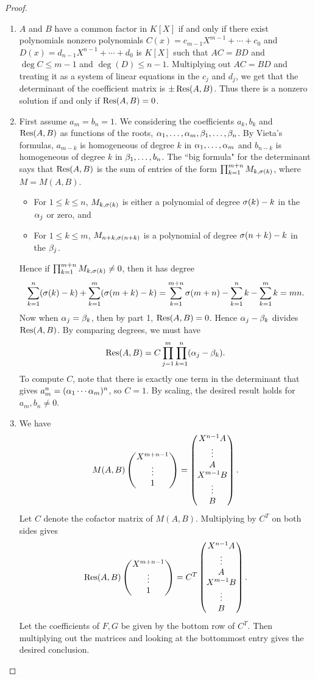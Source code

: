 \begin{proof}$\,$
\begin{enumerate}
\item $A$ and $B$ have a common factor in $K[X]$ if and only if there exist polynomials nonzero polynomials $C(x)=c_{m-1}X^{m-1}+\cdots +c_0$ and $D(x)=d_{n-1}X^{n-1}+\cdots +d_0$ is $K[X]$ such that $AC=BD$ and $\deg C\le m-1$ and $\deg(D)\le n-1$. Multiplying out $AC=BD$ and treating it as a system of linear equations in the $c_j$ and $d_j$, we get that the determinant of the coefficient matrix is $\pm \operatorname{Res}(A,B)$. Thus there is a nonzero solution if and only if $\operatorname{Res}(A,B)=0$.
\item 
First assume $a_m=b_n=1$. We considering the coefficients $a_k,b_k$ and $\operatorname{Res}(A,B)$ as functions of the roots, $\alpha_1,\ldots, \alpha_m,\beta_1,\ldots, \beta_n$. 
By Vieta's formulas, $a_{m-k}$ is homogeneous of degree $k$ in $\alpha_1,\ldots, \alpha_m$ and $b_{n-k}$ is homogeneous of degree $k$ in $\beta_1,\ldots, b_n$. The ``big formula" for the determinant says that $\operatorname{Res}(A,B)$ is the sum of entries of the form $\prod_{k=1}^{m+n}M_{k,\sigma(k)}$, where $M=M(A,B)$. 
\begin{itemize}
\item For $1\le k\le n$, $M_{k,\sigma(k)}$ is either a polynomial of degree $\sigma(k)-k$ in the $\alpha_j$ or zero, and
\item For $1\le k\le m$, $M_{n+k,\sigma(n+k)}$ is a polynomial of degree $\sigma(n+k)-k$ in the $\beta_j$. 
\end{itemize}
Hence if $\prod_{k=1}^{m+n}M_{k,\sigma(k)}\ne 0$, then it has degree
\[
\sum_{k=1}^n (\sigma(k)-k)+\sum_{k=1}^m (\sigma(m+k)-k)=\sum_{k=1}^{m+n}\sigma(m+n) -\sum_{k=1}^n k-\sum_{k=1}^mk=mn.
\]
Now when $\alpha_j=\beta_k$, then by part 1, $\operatorname{Res}(A,B)=0$. Hence $\alpha_j-\beta_k$ divides $\operatorname{Res}(A,B)$. By comparing degrees, we must have
\[
\operatorname{Res}(A,B)=C\prod_{j=1}^m\prod_{k=1}^n (\alpha_j-\beta_k).
\]
To compute $C$, note that there is exactly one term in the determinant that gives $a_m^n=(\alpha_1\cdots \alpha_m)^n$, so $C=1$. 
By scaling, the desired result holds for $a_m,b_n\ne 0$.
\item We have
\[
M(A,B)\begin{pmatrix} {X^{m+n-1}}\\ {\vdots}\\ {1} \end{pmatrix}
=\begin{pmatrix}X^{n-1}A\\ \vdots\\ A\\ X^{m-1}B\\ \vdots\\ B\end{pmatrix}.
\]
Let $C$ denote the cofactor matrix of $M(A,B)$. Multiplying by $C^T$ on both sides gives
\[
\operatorname{Res}(A,B)\begin{pmatrix} {X^{m+n-1}}\\ {\vdots}\\ {1} \end{pmatrix}=C^T\begin{pmatrix}X^{n-1}A\\ \vdots\\ A\\ X^{m-1}B\\ \vdots\\ B\end{pmatrix}.
\]
Let the coefficients of $F,G$ be given by the bottom row of $C^T$. Then multiplying out the matrices and looking at the bottommost entry gives the desired conclusion.\qedhere
\end{enumerate}
\end{proof}